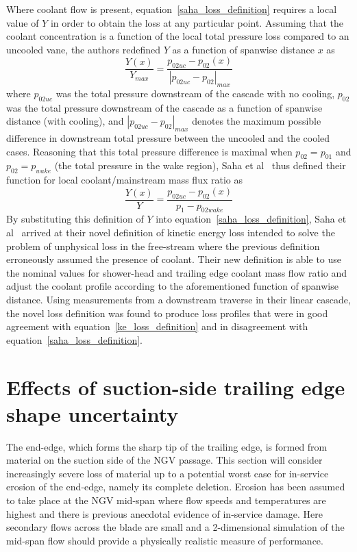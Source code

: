 \documentclass[a4paper, 11pt, oneside]{report}
\begin{document}
Where coolant flow is present, equation~\ref{saha_loss_definition} requires a local value of $Y$ in order to obtain the loss at any particular point. Assuming that the coolant concentration is a function of the local total pressure loss compared to an uncooled vane, the authors redefined $Y$ as a function of spanwise distance $x$ as
\begin{equation}
\frac{Y\left(x\right)}{Y_{max}}
=
\frac{
	p_{02uc} - p_{02}\left(x\right)
}{
	\left| p_{02uc} - p_{02} \right|_{max}
}
\end{equation}
where $p_{02uc}$ was the total pressure downstream of the cascade with no cooling, $p_{02}$ was the total pressure downstream of the cascade as a function of spanwise distance (with cooling), and $\left| p_{02uc} - p_{02} \right|_{max}$ denotes the maximum possible difference in downstream total pressure between the uncooled and the cooled cases. Reasoning that this total pressure difference is maximal when $p_{02}=p_{01}$ and $p_{02}=p_{wake}$ (the total pressure in the wake region), Saha et al~\cite{saha_loss} thus defined their function for local coolant/mainstream mass flux ratio as
\begin{equation}
\frac{Y\left(x\right)}{Y}
=
\frac{
	p_{02uc} - p_{02}\left(x\right)
}{
	p_1 - p_{02wake}
}
\end{equation}
By substituting this definition of $Y$ into equation~\ref{saha_loss_definition}, Saha et al~\cite{saha_loss} arrived at their novel definition of kinetic energy loss intended to solve the problem of unphysical loss in the free-stream where the previous definition erroneously assumed the presence of coolant. Their new definition is able to use the nominal values for shower-head and trailing edge coolant mass flow ratio and adjust the coolant profile according to the aforementioned function of spanwise distance. Using measurements from a downstream traverse in their linear cascade, the novel loss definition was found to produce loss profiles that were in good agreement with equation~\ref{ke_loss_definition} and in disagreement with equation~\ref{saha_loss_definition}.


\section{Effects of suction-side trailing edge shape uncertainty}
\label{suction_side_cutbacks}

The end-edge, which forms the sharp tip of the trailing edge, is formed from material on the suction side of the NGV passage. This section will consider increasingly severe loss of material up to a potential worst case for in-service erosion of the end-edge, namely its complete deletion. Erosion has been assumed to take place at the NGV mid-span where flow speeds and temperatures are highest and there is previous anecdotal evidence of in-service damage. Here secondary flows across the blade are small and a 2-dimensional simulation of the mid-span flow should provide a physically realistic measure of performance.
\end{document}
